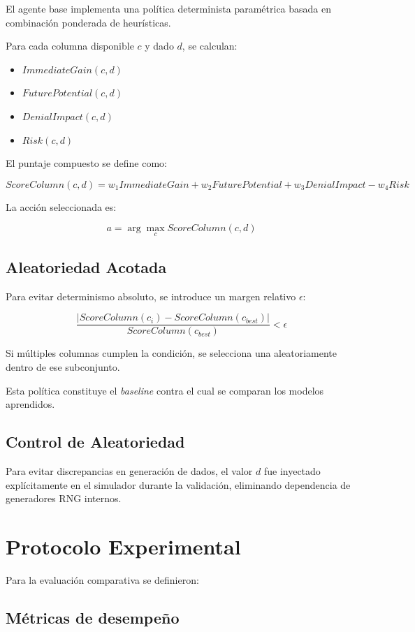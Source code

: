 El agente base implementa una política determinista paramétrica basada en combinación ponderada de heurísticas.

Para cada columna disponible $c$ y dado $d$, se calculan:

\begin{itemize}
    \item $ImmediateGain(c,d)$
    \item $FuturePotential(c,d)$
    \item $DenialImpact(c,d)$
    \item $Risk(c,d)$
\end{itemize}

El puntaje compuesto se define como:

\[
ScoreColumn(c,d) =
w_1 ImmediateGain +
w_2 FuturePotential +
w_3 DenialImpact -
w_4 Risk
\]

La acción seleccionada es:

\[
a = \arg\max_c ScoreColumn(c,d)
\]

\subsection{Aleatoriedad Acotada}

Para evitar determinismo absoluto, se introduce un margen relativo $\epsilon$:

\[
\frac{|ScoreColumn(c_i) - ScoreColumn(c_{best})|}{ScoreColumn(c_{best})} < \epsilon
\]

Si múltiples columnas cumplen la condición, se selecciona una aleatoriamente dentro de ese subconjunto.

Esta política constituye el \textit{baseline} contra el cual se comparan los modelos aprendidos.

\subsection{Control de Aleatoriedad}

Para evitar discrepancias en generación de dados, el valor $d$ fue inyectado explícitamente en el simulador durante la validación, eliminando dependencia de generadores RNG internos.

\section{Protocolo Experimental}

Para la evaluación comparativa se definieron:

\subsection{Métricas de desempeño}


